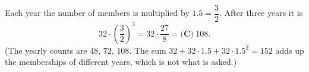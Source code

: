 Each year the number of members is multiplied by $1.5=\dfrac{3}{2}$. After three years it is
\[
32\cdot\left(\dfrac{3}{2}\right)^3=32\cdot\dfrac{27}{8}=\boxed{\textbf{(C)}\ 108}.
\]
(The yearly counts are $48$, $72$, $108$. The sum $32+32\cdot1.5+32\cdot1.5^2=152$ adds up the memberships of different years, which is not what is asked.)
